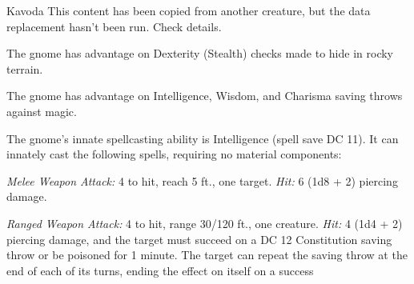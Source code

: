 \documentclass[10pt,a4paper,twoside,bg=print,twocolumn,openany,nodeprecatedcode]{dndbook}
\begin{document}
\clearpage

\begin{DndMonster}[float=t]{Kavoda}
\DndMonsterBasics[
armor-class = {15 (\textit{chain shirt})},
hit-points = {\DndDice{3d6 + 6}},
speed = {20 ft.}
]
\DndMonsterAbilityScores[
 str = 15,
 dex = 14,
 con = 14,
 int = 12,
 wis = 10,
 cha = 9
]
\DndMonsterDetails[
skills = {Investigation +3, Perception +2, Stealth +4},
senses = {darkvision 120 ft., passive perception 12},
languages = {Gnomish, Terran, Undercommon},
challenge = 1/2,
]
This content has been copied from another creature, but the data replacement hasn't been run. Check details.

The gnome has advantage on Dexterity (Stealth) checks made to hide in rocky terrain.

The gnome has advantage on Intelligence, Wisdom, and Charisma saving throws against magic.

The gnome's innate spellcasting ability is Intelligence (spell save DC 11). It can innately cast the following spells, requiring no material components:
\begin{DndMonsterSpells}
\end{DndMonsterSpells}
\textsl{Melee Weapon Attack:} 4 to hit, reach 5 ft., one target. \textsl{Hit:} 6 (1d8 + 2) piercing damage.

\textsl{Ranged Weapon Attack:} 4 to hit, range 30/120 ft., one creature. \textsl{Hit:} 4 (1d4 + 2) piercing damage, and the target must succeed on a DC 12 Constitution saving throw or be poisoned for 1 minute. The target can repeat the saving throw at the end of each of its turns, ending the effect on itself on a success

\end{DndMonster}
\end{document}
